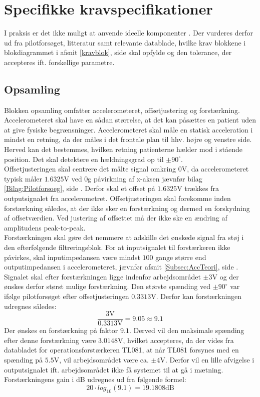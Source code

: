 \section{Specifikke kravspecifikationer}
I praksis er det ikke muligt at anvende ideelle komponenter \cite{Nilsson2011}. Der vurderes derfor ud fra pilotforsøget, litteratur samt relevante datablade, hvilke krav blokkene i blokdiagrammet i afsnit \ref{kravblok}, side \pageref{kravblok} skal opfylde og den tolerance, der accepteres ift. forskellige parametre.

\subsection{Opsamling}\label{OpsamlingsAfs}
Blokken opsamling omfatter accelerometeret, offsetjustering og forstærkning. Accelerometeret skal have en sådan størrelse, at det kan påsættes en patient uden at give fysiske begrænsninger. Accelerometeret skal måle en statisk acceleration i mindst en retning, da der måles i det frontale plan til hhv. højre og venstre side. Herved kan det bestemmes, hvilken retning patienterne hælder mod i stående position. Det skal detektere en hældningsgrad op til $\pm90^{\circ}$. \\
Offsetjusteringen skal centrere det målte signal omkring $0$V, da accelerometeret typisk måler $1.6325$V ved $0$g påvirkning af x-aksen jævnfør bilag \ref{Bilag:Pilotforsoeg}, side \pageref{Bilag:Pilotforsoeg}. Derfor skal et offset på $1.6325$V trækkes fra outputsignalet fra accelerometret. Offsetjusteringen skal forekomme inden forstærkning således, at der ikke sker en forstærkning og dermed en forskydning af offsetværdien. Ved justering af offsettet må der ikke ske en ændring af amplitudens peak-to-peak. \\
Forstærkningen skal gøre det nemmere at adskille det ønskede signal fra støj i den efterfølgende filtreringsblok. For at inputsignalet til forstærkeren ikke påvirkes, skal inputimpedansen være mindst $100$ gange større end outputimpedansen i accelerometeret, jævnfør afsnit \ref{Subsec:AccTeori}, side \pageref{Subsec:AccTeori}. Signalet skal efter forstærkningen ligge indenfor arbejdsområdet $\pm3$V og der ønskes derfor størst mulige forstærkning. Den største spænding ved $\pm90^{\circ}$ var ifølge pilotforsøget efter offsetjusteringen $0.3313$V. Derfor kan forstærkningen udregnes således:
\begin{equation}
\dfrac{3\text{V}}{0.3313\text{V}} =  9.05 \approx 9.1
\end{equation}
\noindent Der ønskes en forstærkning på faktor $9.1$. Derved vil den maksimale spænding efter denne forstærkning være $3.0148$V, hvilket accepteres, da der vides fra databladet for operationsforstærkeren TL081, at når TL081 forsynes med en spænding på $5.5$V, vil arbejdsområdet være ca. $\pm4$V. \cite{Corporation1995} Derfor vil en lille afvigelse i outputsignalet ift. arbejdsområdet ikke få systemet til at gå i mætning. Forstærkningens gain i dB udregnes ud fra følgende formel: 
\begin{equation}
20 \cdot log_{10} (9.1) = 19.1808\text{dB}
\end{equation} 

